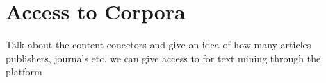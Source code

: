 \section{Access to Corpora}

Talk about the content conectors and give an idea of how many articles publishers, journals etc. we can give access to for text mining through the platform

